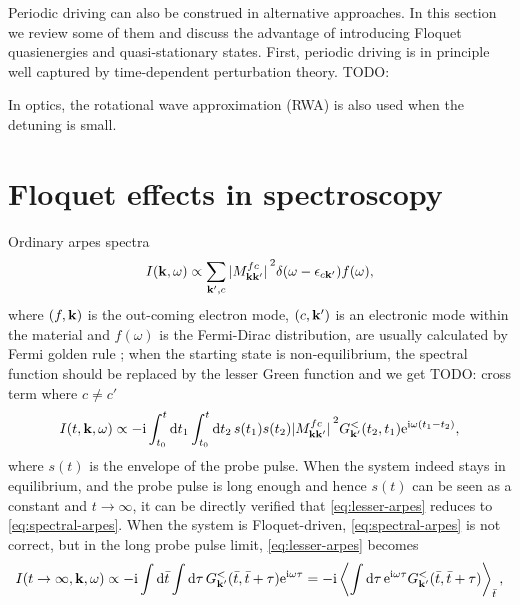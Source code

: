 \documentclass[hyperref, a4paper]{article}
\newcommand*{\ii}{\mathrm{i}}
\newcommand*{\ee}{\mathrm{e}}
\begin{document}
Periodic driving can also be construed in alternative approaches.
In this section we review some of them and discuss the advantage 
of introducing Floquet quasienergies and quasi-stationary states.
First, periodic driving is in principle well captured by time-dependent perturbation theory.
TODO: 

In optics, the rotational wave approximation (RWA) is also used when the detuning is small.

\section{Floquet effects in spectroscopy}

Ordinary \ac{arpes} spectra 
\begin{equation}
    I(\vb{k}, \omega) \propto \sum_{\vb{k}', c} 
    \abs*{M_{\vb{k} \vb{k}'}^{fc}}^2 \delta(\omega - \epsilon_{c \vb{k}'}) f(\omega),
    \label{eq:spectral-arpes}
\end{equation}
where $(f, \vb{k})$ is the out-coming electron mode, 
$(c, \vb{k}')$ is an electronic mode within the material 
and $f(\omega)$ is the Fermi-Dirac distribution,
are usually calculated by Fermi golden rule \cite{sobota2021angle};
when the starting state is non-equilibrium, 
the spectral function should be replaced by the lesser Green function 
and we get \cite{freericks2009theoretical,rustagi2018photoemission,chan2023giant} TODO: cross term where $c \neq c'$
\begin{equation}
    I(t, \vb{k}, \omega) \propto - \ii \int_{t_0}^t \dd{t_1} \int_{t_0}^t \dd{t_2} s(t_1) s(t_2) 
    \abs*{M_{\vb{k} \vb{k}'}^{fc}}^2 G^<_{\vb{k}'}(t_2, t_1) \ee^{\ii \omega (t_1 - t_2)} ,
    \label{eq:lesser-arpes}
\end{equation}
where $s(t)$ is the envelope of the probe pulse.
When the system indeed stays in equilibrium, 
and the probe pulse is long enough and 
hence $s(t)$ can be seen as a constant and $t \to \infty$, 
it can be directly verified that \eqref{eq:lesser-arpes} reduces to \eqref{eq:spectral-arpes}.
When the system is Floquet-driven, \eqref{eq:spectral-arpes} is not correct, 
but in the long probe pulse limit, \eqref{eq:lesser-arpes} becomes 
\begin{equation}
    I(t \to \infty, \vb{k}, \omega) \propto
    - \ii \int \dd{\bar{t}} \int \dd{\tau} G^<_{\vb{k}'}(\bar{t}, \bar{t} + \tau) \ee^{\ii \omega \tau} 
    = - \ii \expval{\int \dd{\tau} \ee^{\ii \omega \tau}
    G^<_{\vb{k}'}(\bar{t}, \bar{t} + \tau)}_{\bar{t}},
\end{equation} 
\end{document}
